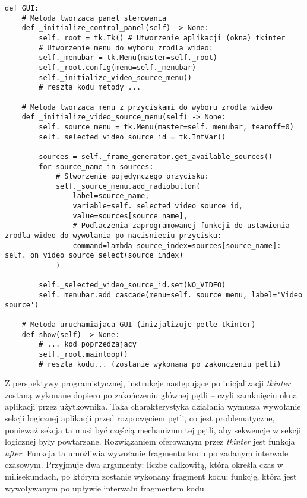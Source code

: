 \begin{lstlisting}[caption={Podłączenie metod pod wydarzenia oraz zainicjalizowanie pętli głównej w module tkinter.}, label={lst:tkinter-event-loop}]
def GUI:
    # Metoda tworzaca panel sterowania
    def _initialize_control_panel(self) -> None:
        self._root = tk.Tk() # Utworzenie aplikacji (okna) tkinter
        # Utworzenie menu do wyboru zrodla wideo:
        self._menubar = tk.Menu(master=self._root)
        self._root.config(menu=self._menubar)
        self._initialize_video_source_menu()
        # reszta kodu metody ...

    # Metoda tworzaca menu z przyciskami do wyboru zrodla wideo 
    def _initialize_video_source_menu(self) -> None:
        self._source_menu = tk.Menu(master=self._menubar, tearoff=0)
        self._selected_video_source_id = tk.IntVar()

        sources = self._frame_generator.get_available_sources()
        for source_name in sources:
            # Stworzenie pojedynczego przycisku:
            self._source_menu.add_radiobutton(
                label=source_name,
                variable=self._selected_video_source_id,
                value=sources[source_name],
                # Podlaczenia zaprogramowanej funkcji do ustawienia zrodla wideo do wywolania po nacisnieciu przycisku:
                command=lambda source_index=sources[source_name]: self._on_video_source_select(source_index) 
            )

        self._selected_video_source_id.set(NO_VIDEO)
        self._menubar.add_cascade(menu=self._source_menu, label='Video source')

    # Metoda uruchamiajaca GUI (inizjalizuje petle tkinter)
    def show(self) -> None:
        # ... kod poprzedzajacy
        self._root.mainloop()
        # reszta kodu... (zostanie wykonana po zakonczeniu petli)

\end{lstlisting}

Z perspektywy programistycznej, instrukcje następujące po inicjalizacji \emph{tkinter} zostaną wykonane dopiero po zakończeniu głównej pętli -- czyli zamknięciu okna aplikacji przez użytkownika.
Taka charakterystyka działania wymusza wywołanie sekcji logicznej aplikacji przed rozpoczęciem pętli, co jest problematyczne, ponieważ sekcja ta musi być częścią mechanizmu tej pętli, aby sekwencje w sekcji logicznej były powtarzane.
Rozwiązaniem oferowanym przez \emph{tkinter} jest funkcja \emph{after}.
Funkcja ta umożliwia wywołanie fragmentu kodu po zadanym interwale czasowym.
Przyjmuje dwa argumenty: liczbe całkowitą, która określa czas w milisekundach, po którym zostanie wykonany fragment kodu; funkcję, która jest wywoływanym po upływie interwału fragmentem kodu. 

